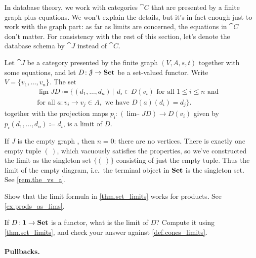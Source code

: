 \documentclass[7Sketches]{subfiles}
\begin{document}
In database theory, we work with categories $\cat{C}$ that are presented by a
finite graph plus equations. We won't explain the details, but it's in fact
enough just to work with the graph part: as far as limits are concerned, the
equations in $\cat{C}$ don't matter. For consistency with the rest of this
section, let's denote the database schema by $\cat{J}$ instead of $\cat{C}$.

\begin{theorem} %
\label{thm.set_limits}%
%
Let $\cat{J}$ be a category presented by the finite graph $(V,A,s,t)$ together with
some equations, and let $D\colon \mathcal{J} \to \mathbf{Set}$ be a set-valued functor. Write $V=\{v_1,\ldots,v_n\}$. The set
\begin{multline*}
  \lim_\cat{J} D \coloneqq \big\{(d_1,\ldots,d_n)\mid d_i\in D(v_i)\text{ for all }1\leq i\leq n\text{ and }\\
  \text{for all }a\colon v_i\to v_j\in A, \text{ we have } D(a)(d_i)=d_j\big\}.
\end{multline*}
together with the projection maps $p_i\colon(\lim_\cat{J} D)\to D(v_i)$ given by $p_i(d_1,\ldots,d_n)\coloneqq d_i$, is a limit of $D$.
\end{theorem}


\begin{example}
   If $J$ is the empty graph \fbox{\color{white}$\LMO{}$}, then $n=0$: there are no vertices. There is
   exactly one empty tuple $(\ )$, which vacuously satisfies the properties, so
   we've constructed the limit as the singleton set $\{ (\ ) \}$ consisting of
   just the empty tuple. Thus the limit of the empty diagram, i.e.\ the terminal object in $\mathbf{Set}$ is the singleton set. See \cref{rem.the_vs_a}.
\end{example}
  
\begin{exercise}%
\label{exc.limit_formula_products}
Show that the limit formula in \cref{thm.set_limits} works for products. See \cref{ex.prods_as_lims}.
\end{exercise}

\begin{exercise}  
  If $D\colon\mathbf{1}\to\mathbf{Set}$ is a functor, what is the limit of $D$? Compute it using \cref{thm.set_limits}, and check your answer against \cref{def.cones_limits}.
\end{exercise}

\paragraph{Pullbacks.}%
%
\end{document}
